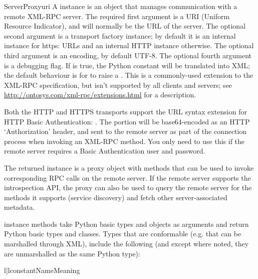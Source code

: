 \begin{classdesc}{ServerProxy}{uri}
A  instance is an object that manages communication
with a remote XML-RPC server.  The required first argument is a URI
(Uniform Resource Indicator), and will normally be the URL of the
server.  The optional second argument is a transport factory instance;
by default it is an internal  instance for https:
URLs and an internal HTTP  instance otherwise.  The
optional third argument is an encoding, by default UTF-8. The optional
fourth argument is a debugging flag.  If  is true, 
the Python constant  will be translated into XML; the
default behaviour is for  to raise a .
This is a commonly-used extension to the XML-RPC specification, but isn't
supported by all clients and servers; see
\url{http://ontosys.com/xml-rpc/extensions.html} for a description. 

Both the HTTP and HTTPS transports support the URL syntax extension for
HTTP Basic Authentication: .  The 
 portion will be base64-encoded as an HTTP `Authorization'
header, and sent to the remote server as part of the connection process
when invoking an XML-RPC method.  You only need to use this if the
remote server requires a Basic Authentication user and password.

The returned instance is a proxy object with methods that can be used
to invoke corresponding RPC calls on the remote server.  If the remote
server supports the introspection API, the proxy can also be used to query
the remote server for the methods it supports (service discovery) and
fetch other server-associated metadata.

 instance methods take Python basic types and objects as 
arguments and return Python basic types and classes.  Types that are
conformable (e.g. that can be marshalled through XML), include the
following (and except where noted, they are unmarshalled as the same
Python type):

\begin{tableii}{l|l}{constant}{Name}{Meaning}
\end{tableii}


\end{classdesc}
